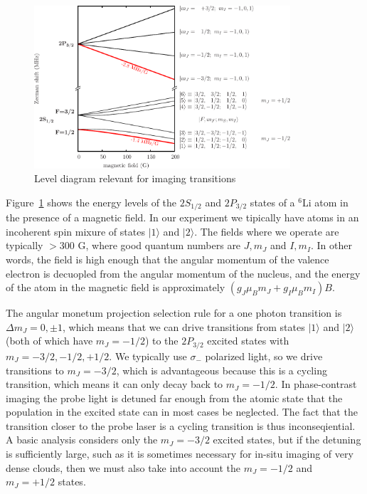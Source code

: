 \documentclass[11pt,letter]{article}
\begin{document}
\begin{figure}[h]
\centering \includegraphics[width=0.85\textwidth]{01eps.pdf}
\caption[Levels relevant for imaging.]{Level diagram relevant for imaging transitions}  \label{fig:levels}
\end{figure}
Figure~\ref{fig:levels} shows the energy levels of the $2S_{1/2}$ and
$2P_{3/2}$ states of a $^{6}$Li atom in the presence of a magnetic field. In
our experiment we tipically have atoms in an incoherent spin mixure of states
$|1\rangle$ and $|2\rangle$.  The fields where we operate are typically $>300$
G, where good quantum numbers are $J,m_{J}$ and $I,m_{I}$.  In other words, the
field is high enough that the angular momentum of the valence electron is
decuopled from the angular momentum of the nucleus, and the energy of the atom
in the magnetic field is approximately $(g_{J}\mu_{B}m_{J} +
g_{I}\mu_{B}m_{I})B$.

The angular monetum projection selection rule for a one photon transition is
$\Delta m_{J} = 0, \pm 1$, which means that we can drive transitions from
states $|1\rangle$ and $|2\rangle$ (both of which have $m_{J}=-1/2$) to the
$2P_{3/2}$ excited states with $m_{J} = -3/2, -1/2, +1/2$.  We typically use
$\sigma_{-}$ polarized light, so we drive transitions to $m_{J}=-3/2$, which is
advantageous because this is a cycling transition, which means it  can only
decay back to $m_{J}=-1/2$.  In phase-contrast imaging the probe light is
detuned far enough from the atomic state that the population in the excited
state can in most cases be neglected.  The fact that the transition closer to
the probe laser is a cycling transition is thus inconseqiential.   A basic
analysis considers only the $m_{J}=-3/2$ excited states, but if the detuning is
sufficiently large, such as it is sometimes necessary for in-situ imaging of
very dense clouds,  then we must also take into account the $m_{J}=-1/2$ and
$m_{J}=+1/2$ states. 
\end{document}
